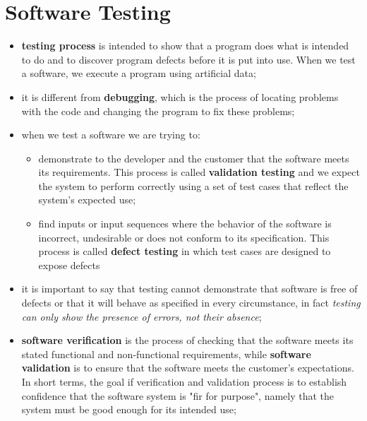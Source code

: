\documentclass[oneside]{article}
\begin{document}




\section{Software Testing}
\begin{itemize}
    \item \textbf{testing process} is intended to show that a program does what is intended to do and to discover program defects before it is put into use. When we test a software, we execute a program using artificial data;
    
    \item it is different from \textbf{debugging}, which is the process of locating problems with the code and changing the program to fix these problems;
    
    \item when we test a software we are trying to:
        \begin{itemize}
            \item demonstrate to the developer and the customer that the software meets its requirements. This process is called \textbf{validation testing} and we expect the system to perform correctly using a set of test cases that reflect the system's expected use;
            \item find inputs or input sequences where the behavior of the software is incorrect, undesirable or does not conform to its specification. This process is called \textbf{defect testing} in which test cases are designed to expose defects
        \end{itemize}
    
    \item it is important to say that testing cannot demonstrate that software is free of defects or that it will behave as specified in every circumstance, in fact \textit{testing can only show the presence of errors, not their absence};
    
    \item \textbf{software verification} is the process of checking that the software meets its stated functional and non-functional requirements, while \textbf{software validation} is to ensure that the software meets the customer's expectations. In short terms, the goal if verification and validation process is to establish confidence that the software system is "fir for purpose", namely that the system must be good enough for its intended use;
    

\end{itemize}
\end{document}

